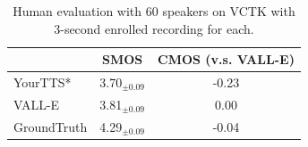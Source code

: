 \documentclass{article}
\theoremstyle{plain}
\theoremstyle{definition}
\theoremstyle{remark}
\newcommand\our{\textsc{VALL-E}}
\begin{document}

\begin{table}[h]
\begin{center}
\caption{Human evaluation with 60 speakers on VCTK with 3-second enrolled recording for each.  }
\begin{tabular}{lcc}
\toprule
& SMOS & CMOS (v.s. \our{})   \\
\hline
YourTTS* & 3.70$_{\pm 0.09}$ &   -0.23 \\ 
\our{} & 3.81$_{\pm 0.09}$ &   0.00    \\ 
GroundTruth & 4.29$_{\pm 0.09}$ &  -0.04    \\ 
 \bottomrule
\end{tabular}
\label{exp:vctk_spk_human}
\end{center}
\end{table}
\end{document}
